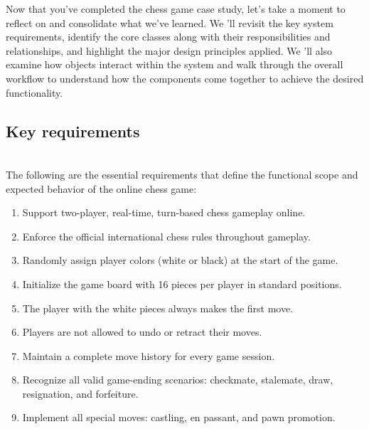 

Now that you've completed the chess game case study, let's take a moment to reflect on and consolidate what we've learned. We 'll revisit the key system requirements, identify the core classes along with their responsibilities and relationships, and highlight the major design principles applied. We
'll also examine how objects interact within the system and walk through the overall workflow to understand how the components come together to achieve the desired functionality.

\subsection{Key requirements}\label{_m4Rw9n7g7wNWfnd5D2aI}
\\
The following are the essential requirements that define the functional scope and expected behavior of the online chess game:

\begin{enumerate}
\item
\protect{}\label{GdSGssBnXRzFDTYMG0aAM}
Support two-player, real-time, turn-based chess gameplay online.
\item
\protect{}\label{U0SWC7CpCqZJeZO-6S_Ve}
Enforce the official international chess rules throughout gameplay.
\item
\protect{}\label{j8G31zU_KUJy1yRWDoTQ5}
Randomly assign player colors (white or black) at the start of the game.
\item
\protect{}\label{uoK89vwxrcR3A75RoMNMv}
Initialize the game board with 16 pieces per player in standard positions.
\item
\protect{}\label{SpiYofM30Vn5VVuZgw57i}
The player with the white pieces always makes the first move.
\item
\protect{}\label{1_dda2CLqBA6B4gXBXgMy}
Players are not allowed to undo or retract their moves.
\item
\protect{}\label{nNDq9AVTfQ7iml4F--asF}
Maintain a complete move history for every game session.
\item
\protect{}\label{j2WOP74e0tDTUAR8ixcNH}
Recognize all valid game-ending scenarios: checkmate, stalemate, draw, resignation, and forfeiture.
\item
\protect{}\label{Xs754bkhaxrryV-qiSt0q}
Implement all special moves: castling, en passant, and pawn promotion.
\end{enumerate}

